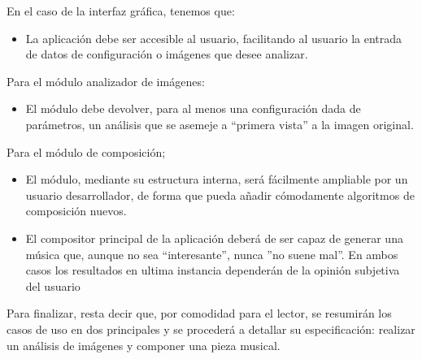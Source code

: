 En el caso de la interfaz gráfica, tenemos que:

\begin{itemize}
	\item La aplicación debe ser accesible al usuario, facilitando al usuario la entrada de datos de configuración o imágenes que desee analizar.

\end{itemize}

Para el módulo analizador de imágenes:

\begin{itemize}
	\item El módulo debe devolver, para al menos una configuración dada de parámetros, un análisis que se asemeje a ``primera vista'' a la imagen original.
\end{itemize}

Para el módulo de composición;
\begin{itemize}
	\item El módulo, mediante su estructura interna, será fácilmente ampliable por un usuario desarrollador, de forma que pueda añadir cómodamente algoritmos de composición nuevos.
	\item El compositor principal de la aplicación deberá de ser capaz de generar una música que, aunque no sea ``interesante'', nunca ''no suene mal''. En ambos casos los resultados en ultima instancia dependerán de la opinión subjetiva del usuario
\end{itemize}

Para finalizar, resta decir que, por comodidad para el lector, se resumirán los casos de uso en dos principales y se procederá a detallar su especificación: realizar un análisis de imágenes y componer una pieza musical.






























